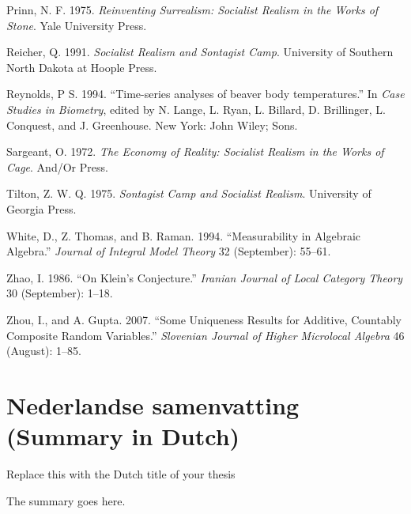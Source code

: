 \documentclass[12pt,english,a4paper,oneside,]{book} %
\newenvironment{dutch}[2][]{\begin{otherlanguage}{dutch}}{\end{otherlanguage}}
\theoremstyle{definition}
\theoremstyle{definition}
\theoremstyle{definition}
\theoremstyle{definition}
\theoremstyle{remark}
\begin{document}
\leavevmode\hypertarget{ref-Prinn1975}{}%
Prinn, N. F. 1975. \emph{Reinventing Surrealism: Socialist Realism in the Works of Stone}. Yale University Press.

\leavevmode\hypertarget{ref-Reicher1991}{}%
Reicher, Q. 1991. \emph{Socialist Realism and Sontagist Camp}. University of Southern North Dakota at Hoople Press.

\leavevmode\hypertarget{ref-Reynolds1994}{}%
Reynolds, P S. 1994. ``Time-series analyses of beaver body temperatures.'' In \emph{Case Studies in Biometry}, edited by N. Lange, L. Ryan, L. Billard, D. Brillinger, L. Conquest, and J. Greenhouse. New York: John Wiley; Sons.

\leavevmode\hypertarget{ref-Sargeant1972}{}%
Sargeant, O. 1972. \emph{The Economy of Reality: Socialist Realism in the Works of Cage}. And/Or Press.

\leavevmode\hypertarget{ref-Tilton1975}{}%
Tilton, Z. W. Q. 1975. \emph{Sontagist Camp and Socialist Realism}. University of Georgia Press.

\leavevmode\hypertarget{ref-White1994}{}%
White, D., Z. Thomas, and B. Raman. 1994. ``Measurability in Algebraic Algebra.'' \emph{Journal of Integral Model Theory} 32 (September): 55--61.

\leavevmode\hypertarget{ref-Zhao1986}{}%
Zhao, I. 1986. ``On Klein's Conjecture.'' \emph{Iranian Journal of Local Category Theory} 30 (September): 1--18.

\leavevmode\hypertarget{ref-Zhou2007}{}%
Zhou, I., and A. Gupta. 2007. ``Some Uniqueness Results for Additive, Countably Composite Random Variables.'' \emph{Slovenian Journal of Higher Microlocal Algebra} 46 (August): 1--85.

\endgroup

\hypertarget{nederlandse-samenvatting-summary-in-dutch}{%
\chapter*{Nederlandse samenvatting (Summary in Dutch)}\label{nederlandse-samenvatting-summary-in-dutch}}


\begin{dutch}

\emph{Replace this with the Dutch title of your thesis}

\bigskip

The summary goes here.

\end{dutch}
\end{document}
